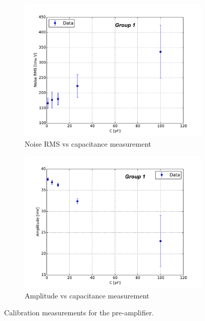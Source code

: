 \documentclass[12pt]{article}
\begin{document}
\begin{figure}[htb]
 \centering
  \begin{subfigure}[t]{0.45\textwidth}
  \centering
  \includegraphics[width=1.2\textwidth]{./graphics/noise_vs_capacitance}
  \caption{Noise RMS vs capacitance measurement}
  \label{fig:Noise_vs_Capacitance}
\end{subfigure}
\hfill
\begin{subfigure}[t]{0.45\textwidth}
  \centering
  \includegraphics[width=1.2\textwidth]{./graphics/amplitude_vs_capacitance}
  \caption{Amplitude vs capacitance measurement}
  \label{fig:Amplitude_vs_Capacitance}
\end{subfigure}
\caption{Calibration measurements for the pre-amplifier.}
\label{fig:calib_others}
\end{figure}
\end{document}
